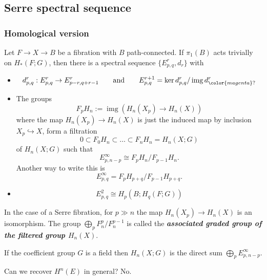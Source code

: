 \subsection{Serre spectral sequence}

\subsubsection{Homological version}

\begin{thm}
	Let $F\to X\to B$ be a fibration with $B$ path-connected. If $\pi_1(B)$ acts trivially on $H_*(F;G)$, then there is a spectral sequence $\{E^r_{p,q},d_r\}$ with
	\begin{itemize}
		\item
			\[d^r_{p,q}:E^r_{p,q}\to E^r_{p-r,q+r-1}\qquad \text{and} \qquad E^{r+1}_{p,q}=\operatorname{ker} d^r_{p,q}/\operatorname{img} d^r_{{\color{magenta}?}}\]
		\item The groups
			\[F_pH_n:=\operatorname{img}(H_n(X_p)\to H_n(X))\]
		where the map $H_{n}(X_p)\to H_{n}(X)$ is just the induced map by inclusion $X_p\hookrightarrow X$, form a filtration
		\[0\subset F_0H_n\subset \ldots\subset F_nH_n=H_n(X;G)\]
		of $H_n(X;G)$ such that
		\[E^\infty_{p,n-p}\cong F_pH_n/F_{p-1}H_n.\]
		Another way to write this is
		\[E_{p,q}^\infty=F_pH_{p+q}\Big/F_{p-1}H_{p+q}.\]
	\item \[E^2_{p,q}\cong H_p(B;H_q(F;G))\]
\end{itemize}
\end{thm}

\begin{remark}
	In the case of a Serre fibration, for $p\gg n$ the map $H_{n}(X_p)\to H_{n}(X)$ is an isomorphism. The group $\bigoplus_{p}F^p_n/F^{p-1}_n$ is called the \textit{\textbf{associated graded group of the filtered group $H_n(X)$}}.
\end{remark}

\begin{remark}
	If the coefficient group $G$ is a field then $H_{n}(X;G)$ is the direct sum $\bigoplus_{p} E^\infty_{p,n-p}$.
\end{remark}

\begin{question}
	Can we recover $H^{n}(E)$ in general? No.
\end{question}


